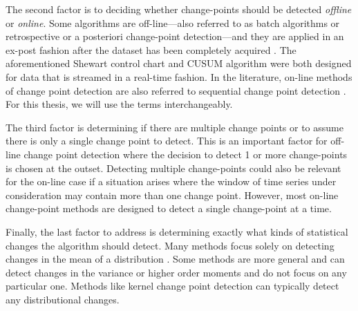 
The second factor is to deciding whether change-points should be detected \textit{offline} or \textit{online}. Some algorithms are off-line---also referred to  as batch algorithms or retrospective or a posteriori change-point detection---and they are applied in an ex-post fashion after the dataset has been completely acquired \cite{truong2018review}. The aforementioned Shewart control chart and CUSUM algorithm were both designed for data that is streamed in a real-time fashion. In the literature, on-line methods of change point detection are also referred to sequential change point detection  \cite{tartakovsky2014sequential}. For this thesis, we will use the terms interchangeably.%


The third factor is determining if there are multiple change points or to assume there is only a single change point to detect. This is an important  factor for off-line change point detection where the decision to detect 1 or more change-points is chosen at the outset.  Detecting multiple change-points could also be relevant for the on-line case if a situation arises where the window of time series under consideration may contain more than one change point. However, most on-line change-point methods are designed to detect a single change-point at a time.

Finally, the last factor to address is determining exactly what kinds of statistical changes the algorithm should detect. Many methods focus solely on detecting changes in the mean of a distribution \cite{lee2010change}. Some methods are more general and can detect changes in the variance or higher order moments and do not focus on any particular one. Methods like kernel change point detection can typically detect any distributional changes. 

